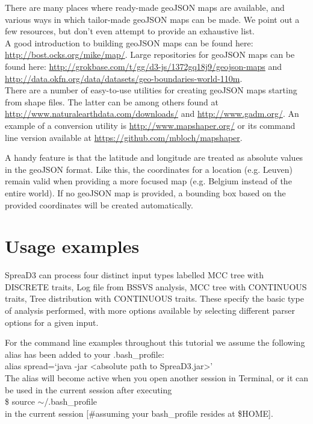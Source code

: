\documentclass[english]{paper}
\begin{document}
There are many places where ready-made geoJSON maps are available, and various ways in which tailor-made geoJSON maps can be made. 
We point out a few resources, but don't even attempt to provide an exhaustive list.
\\
A good introduction to building geoJSON maps can be found here: \url{http://bost.ocks.org/mike/map/}.
Large repositories for geoJSON maps can be found here:
\url{http://grokbase.com/t/gg/d3-js/1372gq18j9/geojson-maps} and \url{http://data.okfn.org/data/datasets/geo-boundaries-world-110m}.
\\
There are a number of easy-to-use utilities for creating geoJSON maps starting from shape files. 
The latter can be among others found at \url{http://www.naturalearthdata.com/downloads/} and \url{http://www.gadm.org/}.
An example of a conversion utility is \url{http://www.mapshaper.org/} or its command line version available at \url{https://github.com/mbloch/mapshaper}.
\par
A handy feature is that the latitude and longitude are treated as absolute values in the geoJSON format.
Like this, the coordinates for a location (e.g. Leuven) remain valid when providing a more focused map (e.g. Belgium instead of the entire world).
If no geoJSON map is provided, a bounding box based on the provided coordinates will be created automatically.

\section{Usage examples}

SpreaD3 can process four distinct input types labelled MCC tree with DISCRETE traits, Log file from BSSVS analysis, MCC tree with CONTINUOUS traits, Tree distribution with CONTINUOUS traits. 
These specify the basic type of analysis performed, with more options available by selecting different parser options for a given input.
% 
% 
\par
For the command line examples throughout this tutorial we assume the following alias has been added to your .bash\_profile:
\\
alias spread=`java -jar <absolute path to SpreaD3.jar>' 
\\
The alias will become active when you open another session in Terminal, or it can be used in the current session after executing
\\
\$ source $\sim$/.bash\_profile
\\
in the current session  [\#assuming your bash\_profile resides at \$HOME]. 
\end{document}
